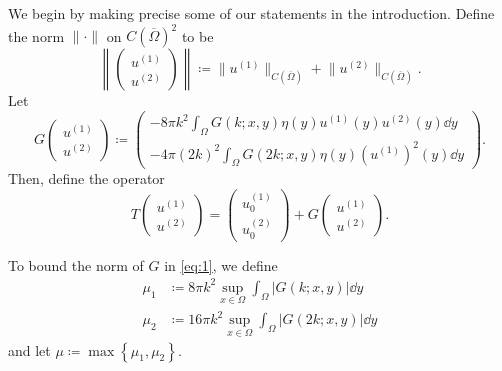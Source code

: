 \documentclass[a4paper, 12pt]{article}
\begin{document}
We begin by making precise some of our statements in the introduction.
Define the norm $\lVert \cdot  \rVert$ on $C\left( \overline{\Omega} \right)^2$ to be
\[
\left\lVert \begin{pmatrix} u^{(1)}\\u^{(2)}\end{pmatrix} \right\rVert
\coloneqq
\lVert u^{(1)} \rVert_{C\left( \overline{\Omega} \right)}+
\lVert u^{(2)} \rVert_{C\left( \overline{\Omega} \right)}
.\]
Let
\begin{equation}\label{eq:1}
G\begin{pmatrix} u^{(1)}\\u^{(2)} \end{pmatrix}\coloneqq
\begin{pmatrix}
	-8\pi k^2 \int_{\Omega}^{} G\left(k; x,y \right) \eta\left( y \right) u^{(1)}\left( y \right) u^{(2)}\left( y \right)\dd{y}\\
	-4 \pi \left( 2k \right)^2\int_{\Omega}^{} G\left(2k; x,y \right) \eta\left( y \right) \left(u^{(1)}\right)^2\left( y \right)\dd{y}
\end{pmatrix}
.\end{equation}
Then, define the operator
\[
T\begin{pmatrix} u^{(1)}\\u^{(2)} \end{pmatrix}  = \begin{pmatrix} u_0^{(1)}\\u_0^{(2)} \end{pmatrix} + G \begin{pmatrix} u^{(1)}\\u^{(2)} \end{pmatrix}
.\]
\iffalse
\begin{align*}
	K_1 &\coloneqq-8\pi k^2 \int_{\Omega}^{} G\left( x,y \right) \eta\left( y \right) u^{(1)}\left( y \right) u^{(2)}\left( y \right)\dd{y}\\
	K_2 &\coloneqq-8\pi k^2 \int_{\Omega}^{} G\left( x,y \right) \eta\left( y \right) u^{(1)}^2\left( y \right)\dd{y}
\end{align*}
\fi
To bound the norm of $G$ in \cref{eq:1}, we define
\begin{align*}
	\mu_1 &\coloneqq 8\pi k^2 \sup_{x \in \Omega}\int_{\Omega}^{} \left| G\left(k; x,y \right) \right|  \dd{y}\\
	\mu_{2}&\coloneqq 16\pi k^2 \sup_{x \in \Omega}\int_{\Omega}^{} \left| G\left(2k; x,y \right) \right|  \dd{y}
\end{align*}
and let $\mu \coloneqq \max \left\{ \mu_1,\mu_2 \right\}$.
\end{document}
